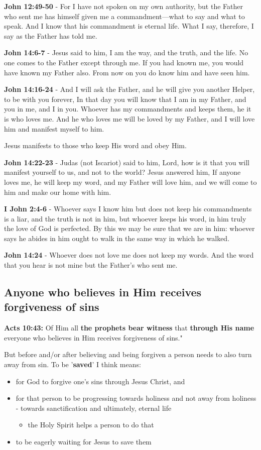 \documentclass[11pt]{article}
\begin{document}
\textbf{John 12:49-50} - For I have not spoken on my own authority, but the Father who sent me has himself given me a commandment—what to say and what to speak. And I know that his commandment is eternal life. What I say, therefore, I say as the Father has told me.

\textbf{John 14:6-7} - Jesus said to him, I am the way, and the truth, and the life. No one comes to the Father except through me. If you had known me, you would have known my Father also. From now on you do know him and have seen him.

\textbf{John 14:16-24} - And I will ask the Father, and he will give you another Helper, to be with you forever, In that day you will know that I am in my Father, and you in me, and I in you. Whoever has my commandments and keeps them, he it is who loves me. And he who loves me will be loved by my Father, and I will love him and manifest myself to him.

Jesus manifests to those who keep His word and obey Him.

\textbf{John 14:22-23} - Judas (not Iscariot) said to him, Lord, how is it that you will manifest yourself to us, and not to the world? Jesus answered him, If anyone loves me, he will keep my word, and my Father will love him, and we will come to him and make our home with him.

\textbf{I John 2:4-6} - Whoever says I know him but does not keep his commandments is a liar, and the truth is not in him, but whoever keeps his word, in him truly the love of God is perfected. By this we may be sure that we are in him: whoever says he abides in him ought to walk in the same way in which he walked.

\textbf{John 14:24} - Whoever does not love me does not keep my words. And the word that you hear is not mine but the Father's who sent me.

\subsection{Anyone who believes in Him receives forgiveness of sins}
\label{sec:orga92741d}
\textbf{Acts 10:43:} Of Him all \textbf{the prophets bear witness} that \textbf{through His name} everyone who believes in Him receives forgiveness of sins."

But before and/or after believing and being forgiven a person needs to also turn away from sin.
To be '\textbf{saved}' I think means:
\begin{itemize}
\item for God to forgive one's sins through Jesus Christ, and
\item for that person to be progressing towards holiness and not away from holiness - towards sanctification and ultimately, eternal life
\begin{itemize}
\item the Holy Spirit helps a person to do that
\end{itemize}
\item to be eagerly waiting for Jesus to save them
\end{itemize}
\end{document}
